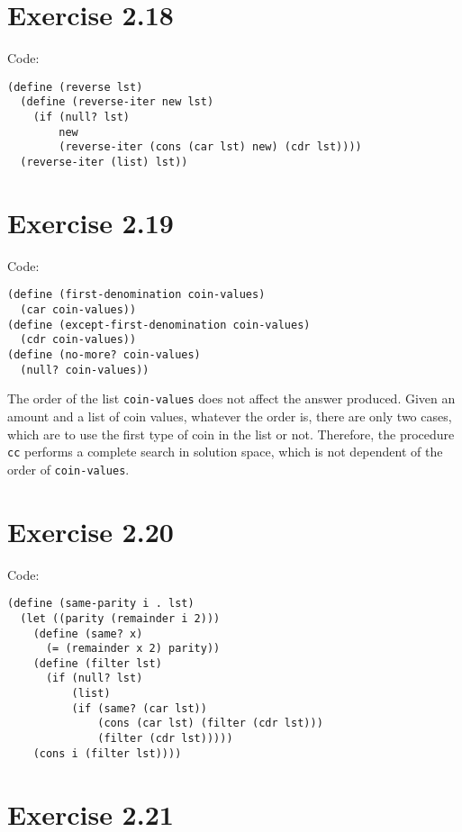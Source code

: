 \documentclass[../main.tex]{subfiles}
\begin{document}
\section{Exercise 2.18}

Code:

\begin{lstlisting}
(define (reverse lst)
  (define (reverse-iter new lst)
    (if (null? lst)
        new
        (reverse-iter (cons (car lst) new) (cdr lst))))
  (reverse-iter (list) lst))
\end{lstlisting}

\section{Exercise 2.19}

Code:

\begin{lstlisting}
(define (first-denomination coin-values)
  (car coin-values))
(define (except-first-denomination coin-values)
  (cdr coin-values))
(define (no-more? coin-values)
  (null? coin-values))
\end{lstlisting}

The order of the list \lstinline{coin-values} does not
 affect the answer produced. Given an amount and a
 list of coin values, whatever the order is, there are
 only two cases, which are to use the first type of coin
 in the list or not. Therefore, the procedure \lstinline{cc}
 performs a complete search in solution space, which
 is not dependent of the order of \lstinline{coin-values}.

\section{Exercise 2.20}

Code:

\begin{lstlisting}
(define (same-parity i . lst)
  (let ((parity (remainder i 2)))
    (define (same? x)
      (= (remainder x 2) parity))
    (define (filter lst)
      (if (null? lst)
          (list)
          (if (same? (car lst))
              (cons (car lst) (filter (cdr lst)))
              (filter (cdr lst)))))
    (cons i (filter lst))))
\end{lstlisting}

\section{Exercise 2.21}
\end{document}

